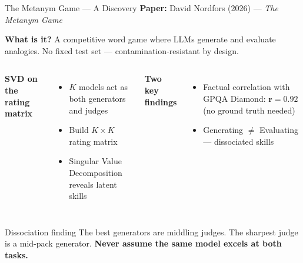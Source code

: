 \documentclass[11pt, aspectratio=169]{beamer}
\begin{document}
\begin{frame}{The Metanym Game --- A Discovery}
  \textbf{Paper:} David Nordfors (2026) --- \textit{The Metanym Game}

  \vspace{0.15cm}
  \textbf{What is it?} A competitive word game where LLMs generate and
  evaluate analogies. No fixed test set --- contamination-resistant by design.

  \vspace{0.2cm}
  \begin{columns}[T]
      \textbf{SVD on the rating matrix}
      \vspace{0.1cm}
      \begin{itemize}\small
        \item $K$ models act as both generators and judges
        \item Build $K \times K$ rating matrix
        \item Singular Value Decomposition reveals latent skills
      \end{itemize}

      \textbf{Two key findings}
      \vspace{0.1cm}
      \begin{itemize}\small
        \item[1.] Factual correlation with GPQA Diamond:
          $\mathbf{r = 0.92}$
          (no ground truth needed)
        \item[2.] \alert{Generating $\boldsymbol{\neq}$ Evaluating}
          --- dissociated skills
      \end{itemize}
  \end{columns}

  \vspace{0.2cm}
  \begin{alertblock}{Dissociation finding}
    The best generators are middling judges. The sharpest judge is a mid-pack
    generator. \textbf{Never assume the same model excels at both tasks.}
  \end{alertblock}
\end{frame}
\end{document}
